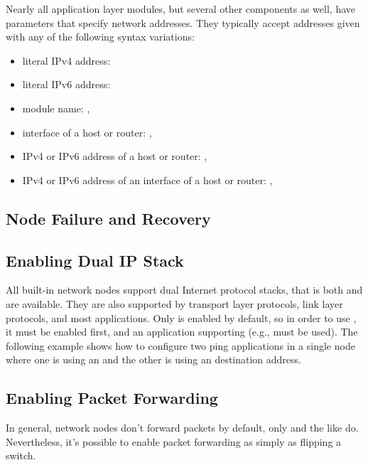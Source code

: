 Nearly all application layer modules, but several other components as well,
have parameters that specify network addresses. They typically accept
addresses given with any of the following syntax variations:

\begin{itemize}
  \item literal IPv4 address: 
  \item literal IPv6 address: 
  \item module name: , 
  \item interface of a host or router: , 
  \item IPv4 or IPv6 address of a host or router: ,
  \item IPv4 or IPv6 address of an interface of a host or router:
      , 
\end{itemize}

\subsection{Node Failure and Recovery}
\label{sec:networks:node-failure-and-recovery}

\subsection{Enabling Dual IP Stack}
\label{sec:networks:enabling-dual-ip-stack}

All built-in network nodes support dual Internet protocol stacks, that is
both  and  are available. They are also
supported by transport layer protocols, link layer protocols, and most
applications. Only  is enabled by default, so in order to
use , it must be enabled first, and an application
supporting  (e.g.,  must be used). The
following example shows how to configure two ping applications in a single
node where one is using an  and the other is using an
 destination address.


\subsection{Enabling Packet Forwarding}
\label{sec:networks:enabling-packet-forwarding}

In general, network nodes don't forward packets by default, only
 and the like do. Nevertheless, it's possible to enable
packet forwarding as simply as flipping a switch.





